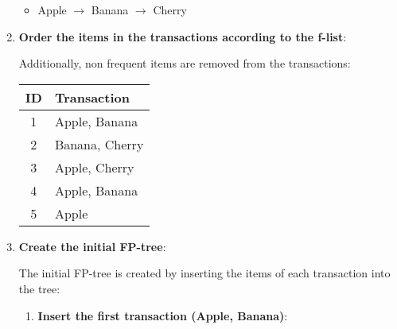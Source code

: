 \documentclass[
english,
smallborders
]{i6prcsht}
\begin{document}
\begin{solution}
\begin{enumerate}
		      \begin{itemize}
			      \item Apple $\rightarrow$ Banana $\rightarrow$ Cherry
		      \end{itemize}

		\item \textbf{Order the items in the transactions according to the f-list}:

		      Additionally, non frequent items are removed from the transactions:

		      \begin{center}
			      \begin{tabular}{|c|l|}
				      \hline
				      \textbf{ID} & \textbf{Transaction} \\
				      \hline
				      1           & Apple, Banana        \\
				      \hline
				      2           & Banana, Cherry       \\
				      \hline
				      3           & Apple, Cherry        \\
				      \hline
				      4           & Apple, Banana        \\
				      \hline
				      5           & Apple                \\
				      \hline
			      \end{tabular}
		      \end{center}

		      \newpage

		\item \textbf{Create the initial FP-tree}:

		      The initial FP-tree is created by inserting the items of each transaction into the tree:

		      \begin{enumerate}
			      \item \textbf{Insert the first transaction (Apple, Banana)}:

			            \begin{center}
\end{center}
\end{enumerate}
\end{enumerate}
\end{solution}
\end{document}

